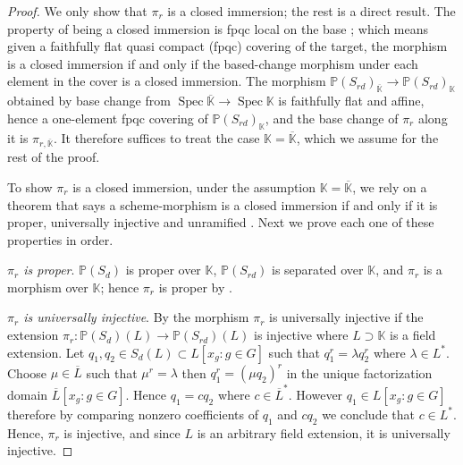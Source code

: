 \documentclass[final]{article}
\newcommand{\K}{\mathbb{K}}
\newcommand{\PP}{\mathbb{P}}
\theoremstyle{definition}
\theoremstyle{plain}
\begin{document}
\begin{proof}
We only show that $\pi_r$ is a closed immersion; the rest is a direct result.
The property of being a closed immersion is fpqc local on the base
\cite[\href{https://stacks.math.columbia.edu/tag/02L6}{Lemma 02L6}]{stacks-project}; which means given a faithfully flat quasi compact (fpqc) covering of the target, the morphism is a closed immersion if and only if the based-change morphism under each element in the cover is a closed immersion.
The morphism $\PP(S_{rd})_{\overline{\K}} \to \PP(S_{rd})_{\K}$ obtained by base change
from $\operatorname{Spec} \overline{\K} \to \operatorname{Spec} \K$ is faithfully flat and
affine, hence a one-element fpqc covering of $\PP(S_{rd})_{\K}$, and the base change of
$\pi_r$ along it is $\pi_{r, \overline{\K}}$. It therefore suffices to treat the case
$\K = \overline{\K}$, which we assume for the rest of the proof.

To show $\pi_r$ is a closed immersion, under the assumption $\K=\overline{\K}$, we rely on a theorem that says a scheme-morphism is a closed immersion if and only if it is proper, universally injective and unramified 
\cite[\href{https://stacks.math.columbia.edu/tag/04XV}{Lemma 04XV}]{stacks-project}.
Next we prove each one of these properties in order.

\emph{$\pi_r$ is proper}. $\PP(S_d)$ is proper over $\K$, $\PP(S_{rd})$ is separated over $\K$, and $\pi_r$ is a morphism over $\K$; hence
$\pi_r$ is proper by 
\cite[\href{https://stacks.math.columbia.edu/tag/01W6}{Lemma 01W6}]{stacks-project}.

\emph{$\pi_r$ is universally injective}. By \cite[\href{https://stacks.math.columbia.edu/tag/01S4}{Lemma 01S4}]{stacks-project}
the morphism $\pi_r$ is universally injective if the extension $\pi_r: \PP(S_d)(L) \to \PP(S_{rd})(L)$ is injective where $L \supset \K$ is a field extension. 
Let $q_1, q_2 \in S_d(L) \subset L[x_g: g\in G]$ such that $q_1^r = \lambda q_2^r$ where $\lambda \in L^*$. Choose $\mu \in \overline{L}$ such that $\mu^r = \lambda$ then $q_1^r = (\mu q_2)^r$ in the unique factorization domain $\overline{L}[x_g: g\in G]$. Hence $q_1 = c q_2$ where $c \in \overline{L}^*$. 
However $q_1 \in L[x_g: g\in G]$ therefore by comparing nonzero coefficients of $q_1$ and $cq_2$ we conclude that $c\in L^*$. Hence, $\pi_r$ is injective, and since $L$ is an arbitrary field extension, it is universally injective. 


\end{proof}
\end{document}
